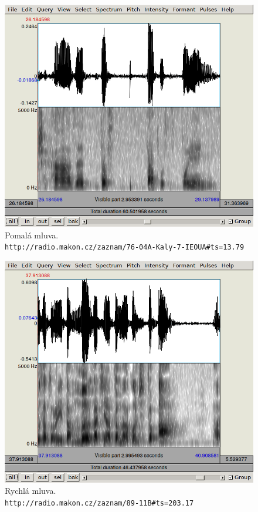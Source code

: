 \begin{figure}[htpb]
\includegraphics[scale=0.89]{rc/spectrum-pomala-mluva-76-04A.png}
\caption{
    Pomalá mluva.\\
    \texttt{http://radio.makon.cz/zaznam/76-04A-Kaly-7-IEOUA\#ts=13.79}
}
\label{fig:spectr-slowtalk}
\end{figure}

\begin{figure}[htpb]
\includegraphics[scale=0.89]{rc/spectrum-rychla-mluva-89-11B.png}
\caption{
    Rychlá mluva.\\
    \texttt{http://radio.makon.cz/zaznam/89-11B\#ts=203.17}
}
\label{fig:spectr-fasttalk}
\end{figure}

